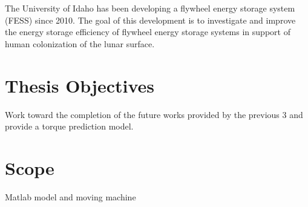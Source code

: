 \onehalfspacing

The University of Idaho has been developing a flywheel energy storage system (FESS) since 2010. The goal of this development is to investigate and improve the energy storage efficiency of flywheel energy storage systems in support of human colonization of the lunar surface. 

\section{Thesis Objectives}
Work toward the completion of the future works provided by the previous 3 and provide a torque prediction model.

\section{Scope}
Matlab model and moving machine

